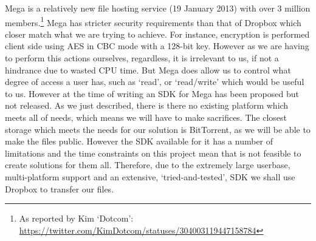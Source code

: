 \documentclass[12pt, titlepage]{article}
\begin{document}
\newline \indent Mega is a relatively new file hosting service (19 January 2013) with over 3 million members.\footnote{As reported by Kim `Dotcom': \url{https://twitter.com/KimDotcom/statuses/304003119447158784}} Mega  has stricter security requirements than that of Dropbox which closer match what we are trying to achieve. For instance, encryption is performed client side using AES in CBC mode with a 128-bit key.\cite{megaDev} However as we are having to perform this actions ourselves, regardless, it is irrelevant to us, if not a hindrance due to wasted CPU time. But Mega does allow us to control what degree of access a user has, such as `read', or `read/write' which would be useful to us. However at the time of writing an SDK for Mega has been proposed but not released.
\newline \indent As we just described, there is there no existing platform which meets all of needs, which means we will have to make sacrifices. The closest storage which meets the needs for our solution is BitTorrent, as we will be able to make the files public. However the SDK available for it has a number of limitations and the time constraints on this project mean that is not feasible to create solutions for them all. Therefore, due to the extremely large userbase, multi-platform support and an extensive, `tried-and-tested', SDK we shall use Dropbox to transfer our files.
\end{document}
